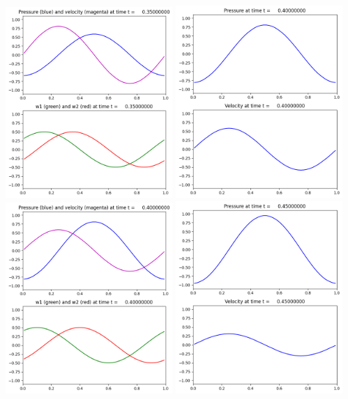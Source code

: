 \documentclass[11pt]{article}
\begin{document}
\includegraphics[width=0.475\textwidth]{frame0007fig2.png}
\vskip 10pt 
\includegraphics[width=0.475\textwidth]{frame0008fig1.png}
\includegraphics[width=0.475\textwidth]{frame0008fig2.png}
\vskip 10pt 
\includegraphics[width=0.475\textwidth]{frame0009fig1.png}
\end{document}
